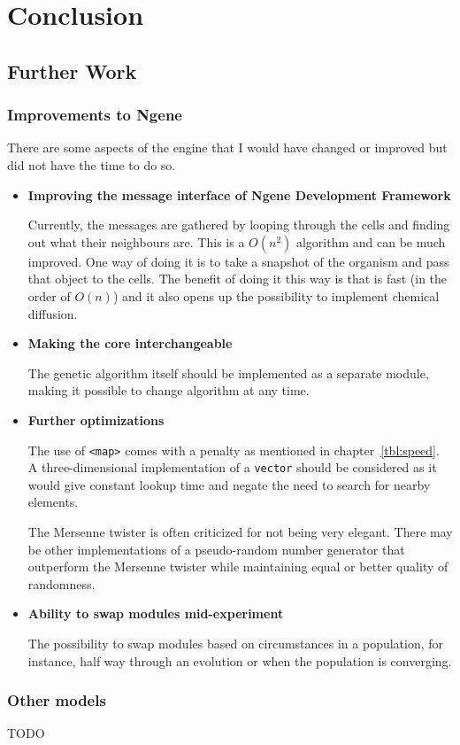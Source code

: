 \section{Conclusion}

\subsection{Further Work}

\subsubsection{Improvements to Ngene}
There are some aspects of the engine that I would have changed or improved but did not have the time to do so.

\begin{itemize}
	\itemsep=0pt
	\item\textbf{Improving the message interface of Ngene Development Framework}

	Currently, the messages are gathered by looping through the cells and finding out what their neighbours are. This is a $O(n^{2})$ algorithm and can be much improved. One way of doing it is to take a snapshot of the organism and pass that object to the cells. The benefit of doing it this way is that is fast (in the order of $O(n)$) and it also opens up the possibility to implement chemical diffusion.

	\item\textbf{Making the core interchangeable}

	The genetic algorithm itself should be implemented as a separate module, making it possible to change algorithm at any time.

	\item\textbf{Further optimizations}

	The use of \texttt{<map>} comes with a penalty as mentioned in chapter~\ref{tbl:speed}. A three-dimensional implementation of a \texttt{vector} should be considered as it would give constant lookup time and negate the need to search for nearby elements.

	The Mersenne twister is often criticized for not being very elegant. There may be other implementations of a pseudo-random number generator that outperform the Mersenne twister while maintaining equal or better quality of randomness.

	\item\textbf{Ability to swap modules mid-experiment}

	The possibility to swap modules based on circumstances in a population, for instance, half way through an evolution or when the population is converging.
\end{itemize}

\subsubsection{Other models}

TODO

